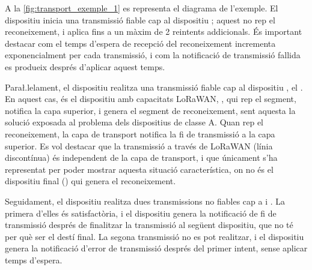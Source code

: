 \documentclass{tfgitic}[2024/07/01]
\begin{document}
{A la \autoref{fig:transport_exemple_1} es representa el diagrama de l'exemple. El dispositiu  inicia una transmissió fiable cap al dispositiu ; aquest no rep el reconeixement, i aplica fins a un màxim de 2 reintents addicionals. És important destacar com el temps d'espera de recepció del reconeixement incrementa exponencialment per cada transmissió, i com la notificació de transmissió fallida es produeix després d'aplicar aquest temps. 

Para\l.lelament, el dispositiu  realitza una transmissió fiable cap al dispositiu , el . En aquest cas, és el dispositiu amb capacitats LoRaWAN, , qui rep el segment, notifica la capa superior, i genera el segment de reconeixement, sent aquesta la solució exposada al problema dels dispositius de classe A. Quan  rep el reconeixement, la capa de transport notifica la fi de transmissió a la capa superior.
Es vol destacar que la transmissió a través de LoRaWAN (línia discontínua) és independent de la capa de transport, i que únicament s'ha representat per poder mostrar aquesta situació característica, on no és el dispositiu final () qui genera el reconeixement.

Seguidament, el dispositiu  realitza dues transmissions no fiables cap a  i . La primera d'elles és satisfactòria, i el dispositiu genera la notificació de fi de transmissió després de finalitzar la transmissió al següent dispositiu, que no té per què ser el destí final. La segona transmissió no es pot realitzar, i el dispositiu genera la notificació d'error de transmissió després del primer intent, sense aplicar temps d'espera.

\begin{figure}
    \centering
\end{figure}}
\end{document}
